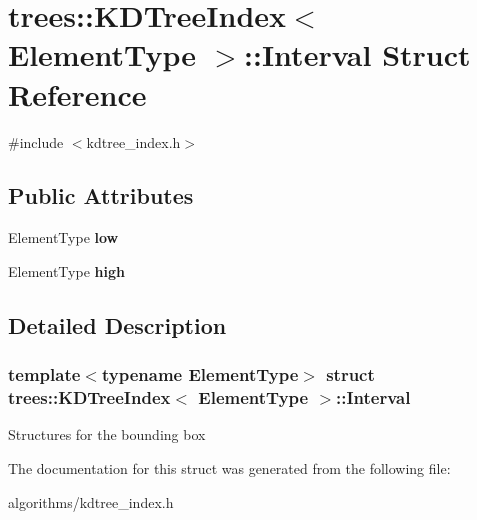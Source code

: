 \hypertarget{structtrees_1_1_k_d_tree_index_1_1_interval}{}\section{trees\+:\+:K\+D\+Tree\+Index$<$ Element\+Type $>$\+:\+:Interval Struct Reference}
\label{structtrees_1_1_k_d_tree_index_1_1_interval}


{\ttfamily \#include $<$kdtree\+\_\+index.\+h$>$}

\subsection*{Public Attributes}
\begin{DoxyCompactItemize}
\item 
\mbox{\label{structtrees_1_1_k_d_tree_index_1_1_interval_af0a3a4d4916319eb8b487aaee6ce3241}} 
Element\+Type {\bfseries low}
\item 
\mbox{\label{structtrees_1_1_k_d_tree_index_1_1_interval_a1a77acac4f1ee40f913c2b64399b1d19}} 
Element\+Type {\bfseries high}
\end{DoxyCompactItemize}


\subsection{Detailed Description}
\subsubsection*{template$<$typename Element\+Type$>$\newline
struct trees\+::\+K\+D\+Tree\+Index$<$ Element\+Type $>$\+::\+Interval}

Structures for the bounding box 

The documentation for this struct was generated from the following file\+:\begin{DoxyCompactItemize}
\item 
algorithms/kdtree\+\_\+index.\+h\end{DoxyCompactItemize}
